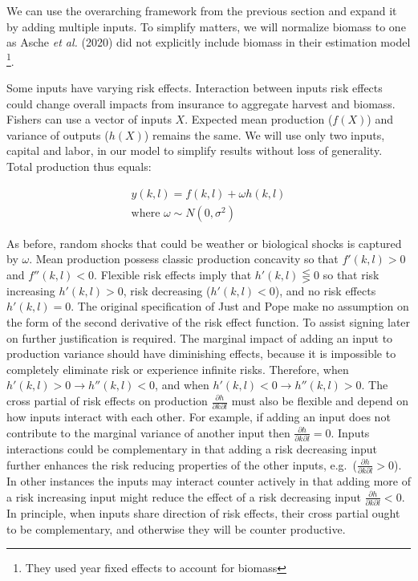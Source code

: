 \documentclass[
  letterpaper,
  DIV=11,
  numbers=noendperiod]{scrartcl}
\theoremstyle{plain}
\theoremstyle{plain}
\theoremstyle{remark}
\begin{document}
We can use the overarching framework from the previous section and
expand it by adding multiple inputs. To simplify matters, we will
normalize biomass to one as Asche \emph{et al.} (2020) did not
explicitly include biomass in their estimation model \footnote{They used
  year fixed effects to account for biomass}.

Some inputs have varying risk effects. Interaction between inputs risk
effects could change overall impacts from insurance to aggregate harvest
and biomass. Fishers can use a vector of inputs \(X\). Expected mean
production (\(f(X)\)) and variance of outputs (\(h(X)\)) remains the
same. We will use only two inputs, capital and labor, in our model to
simplify results without loss of generality. Total production thus
equals:

\[
\begin{aligned}
y(k,l)=f(k,l)+\omega h(k,l)\\
\text{where }\omega \sim N(0,\sigma^2)
\end{aligned}
\]

As before, random shocks that could be weather or biological shocks is
captured by \(\omega\). Mean production possess classic production
concavity so that \(f'(k,l)>0\) and \(f''(k,l)<0\). Flexible risk
effects imply that \(h'(k,l)\lesseqgtr0\) so that risk increasing
\(h'(k,l)>0\), risk decreasing (\(h'(k,l)<0\)), and no risk effects
\(h'(k,l)=0\). The original specification of Just and Pope make no
assumption on the form of the second derivative of the risk effect
function. To assist signing later on further justification is required.
The marginal impact of adding an input to production variance should
have diminishing effects, because it is impossible to completely
eliminate risk or experience infinite risks. Therefore, when
\(h'(k,l)>0 \rightarrow h''(k,l)<0\), and when
\(h'(k,l)<0 \rightarrow h''(k,l)>0\). The cross partial of risk effects
on production \(\frac{\partial h}{\partial k \partial l}\) must also be
flexible and depend on how inputs interact with each other. For example,
if adding an input does not contribute to the marginal variance of
another input then \(\frac{\partial h}{\partial k \partial l}=0\).
Inputs interactions could be complementary in that adding a risk
decreasing input further enhances the risk reducing properties of the
other inputs, e.g.~(\(\frac{\partial h}{\partial k \partial l}>0\)). In
other instances the inputs may interact counter actively in that adding
more of a risk increasing input might reduce the effect of a risk
decreasing input \(\frac{\partial h}{\partial k \partial l}<0\). In
principle, when inputs share direction of risk effects, their cross
partial ought to be complementary, and otherwise they will be counter
productive.
\end{document}
